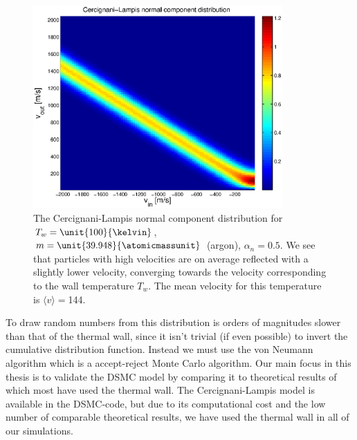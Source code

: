\begin{figure}[h]
\begin{center}
\includegraphics[width=0.85\textwidth, trim=0cm 0cm 0cm 0cm, clip]{DSMC/figures/cercignani-lampis.eps}
\end{center}
\caption{The Cercignani-Lampis normal component distribution for $T_w=\unit{100}{\kelvin}$, $m=\unit{39.948}{\atomicmassunit}$ (argon), $\alpha_n=0.5$. We see that particles with high velocities are on average reflected with a slightly lower velocity, converging towards the velocity corresponding to the wall temperature $T_w$. The mean velocity for this temperature is $\langle v \rangle = $\unit{144}{\meter\per\second}.}
\label{fig:cercignani_lampis}
\end{figure}

To draw random numbers from this distribution is orders of magnitudes slower than that of the thermal wall, since it isn't trivial (if even possible) to invert the cumulative distribution function. Instead we must use the von Neumann algorithm which is a accept-reject Monte Carlo algorithm\cite{allen1989computer}. Our main focus in this thesis is to validate the DSMC model by comparing it to theoretical results of which most have used the thermal wall. The Cercignani-Lampis model is available in the DSMC-code, but due to its computational cost and the low number of comparable theoretical results, we have used the thermal wall in all of our simulations. 